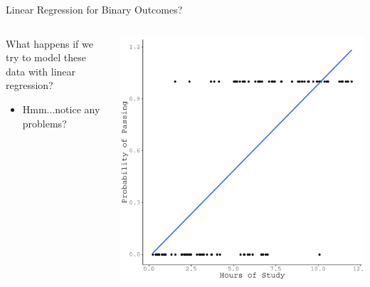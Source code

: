 \documentclass{beamer}\usepackage[]{graphicx}\usepackage[]{color}
\makeatletter
\def\maxwidth{ %
  \ifdim\Gin@nat@width>\linewidth
    \linewidth
  \else
    \Gin@nat@width
  \fi
}
\newenvironment{knitrout}{}{} %
\makeatother
\begin{document}

\begin{frame}{Linear Regression for Binary Outcomes?}

  \begin{columns}
    \begin{column}{0.5\textwidth}
      
      What happens if we try to model these data with linear regression?  
      \vc
      \begin{itemize}
      \item Hmm...notice any problems?
      \end{itemize}
      
    \end{column}
    
    \begin{column}{0.5\textwidth}
      
\begin{knitrout}\footnotesize
{}\color{fgcolor}

{\centering \includegraphics[width=\maxwidth]{figure/unnamed-chunk-2-1} 

}



\end{knitrout}

\end{column}
\end{columns}

\end{frame}
\end{document}
